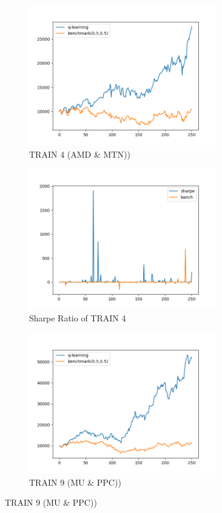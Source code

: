 \begin{figure}[H]
\begin{subfigure}{.5\textwidth}
\includegraphics[clip, width=0.9\textwidth]{Graphics/trainParameter3WT.png} \caption{TRAIN 4 (AMD \& MTN))} 
\end{subfigure}%
\begin{subfigure}{.5\textwidth}%
\centering
\includegraphics[clip, width=0.9\textwidth]{Graphics/trainParameter3WTS.png} \caption{Sharpe Ratio of TRAIN 4}
\end{subfigure}%
\vspace{0.1cm}
\begin{subfigure}{.5\textwidth}%
\centering
\includegraphics[clip, width=0.9\textwidth]{Graphics/trainPA9.png} \caption{TRAIN 9 (MU \& PPC))} 

\end{subfigure}
\end{figure}
